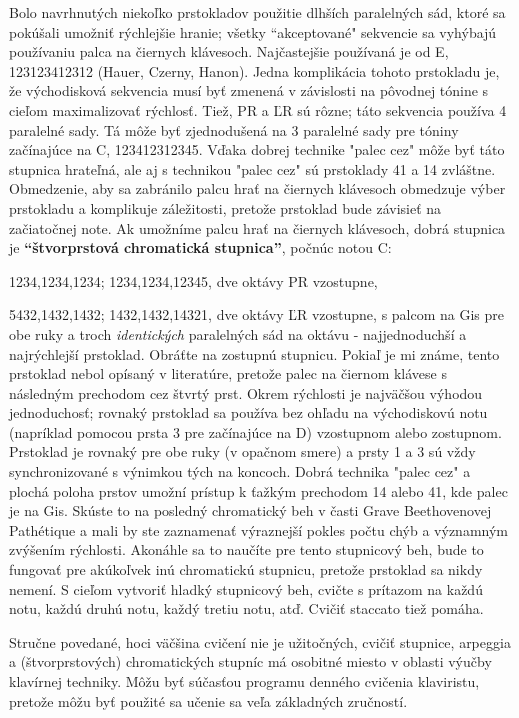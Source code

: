 \documentclass[11pt,a4paper]{book}
\begin{document}
Bolo navrhnutých niekoľko prstokladov použitie dlhších paralelných sád, ktoré sa pokúšali umožniť rýchlejšie hranie; všetky “akceptované" sekvencie sa vyhýbajú používaniu palca na čiernych klávesoch. Najčastejšie používaná je od E, 123123412312 (Hauer, Czerny, ​​Hanon). Jedna komplikácia tohoto prstokladu je, že východisková sekvencia musí byť zmenená v závislosti na pôvodnej tónine s cieľom maximalizovať rýchlosť. Tiež, PR a ĽR sú rôzne; táto sekvencia používa 4 paralelné sady. Tá môže byť zjednodušená na 3 paralelné sady pre tóniny začínajúce na C, 123412312345. Vďaka dobrej technike "palec cez" môže byť táto stupnica hrateľná, ale aj s technikou "palec cez" sú prstoklady 41 a 14 zvláštne. Obmedzenie, aby sa zabránilo palcu hrať na čiernych klávesoch obmedzuje výber prstokladu a komplikuje záležitosti, pretože prstoklad bude závisieť na začiatočnej note. Ak umožníme palcu hrať na čiernych klávesoch, dobrá stupnica je \textbf{“štvorprstová chromatická stupnica”}, počnúc notou C:

1234,1234,1234; 1234,1234,12345, dve oktávy PR vzostupne,

5432,1432,1432; 1432,1432,14321, dve oktávy ĽR vzostupne, s palcom na Gis pre obe ruky a troch \emph{identických} paralelných sád na oktávu - najjednoduchší a najrýchlejší prstoklad. Obráťte na zostupnú stupnicu. Pokiaľ je mi známe, tento prstoklad nebol opísaný v literatúre, pretože palec na čiernom klávese s následným prechodom cez štvrtý prst. Okrem rýchlosti je najväčšou výhodou jednoduchosť; rovnaký prstoklad sa používa bez ohľadu na východiskovú notu (napríklad pomocou prsta 3 pre začínajúce na D) vzostupnom alebo zostupnom. Prstoklad je rovnaký pre obe ruky (v opačnom smere) a prsty 1 a 3 sú vždy synchronizované s výnimkou tých na koncoch. Dobrá technika "palec cez" a plochá poloha prstov umožní prístup k ťažkým prechodom 14 alebo 41, kde palec je na Gis. Skúste to na posledný chromatický beh v časti Grave Beethovenovej Pathétique a mali by ste zaznamenať výraznejší pokles počtu chýb a významným zvýšením rýchlosti. Akonáhle sa to naučíte pre tento stupnicový beh, bude to fungovať pre akúkoľvek inú chromatickú stupnicu, pretože prstoklad sa nikdy nemení. S cieľom vytvoriť hladký stupnicový beh, cvičte s prítazom na každú notu, každú druhú notu, každý tretiu notu, atď. Cvičiť staccato tiež pomáha.

Stručne povedané, hoci väčšina cvičení nie je užitočných, cvičiť stupnice, arpeggia a (štvorprstových) chromatických stupníc má osobitné miesto v oblasti výučby klavírnej techniky. Môžu byť súčasťou programu denného cvičenia klaviristu, pretože môžu byť použité sa učenie sa veľa základných zručností.
\end{document}
